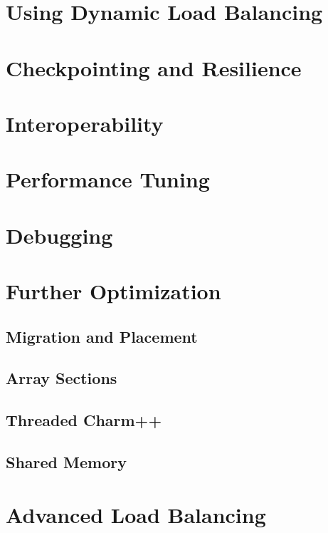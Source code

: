 \documentclass{beamer}
\begin{document}
\section[LB]{Using Dynamic Load Balancing}

\section[Fault Tol]{Checkpointing and Resilience}

\section[AMPI & Interop]{Interoperability}

\section[Tuning]{Performance Tuning}

\section[Debugging]{Debugging}


\section[Messages, Groups, Shared Mem]{Further Optimization}
\subsection[PUP and Placement]{Migration and Placement}



\subsection[Array Sections]{Array Sections}

\subsection[Threaded]{Threaded Charm++}

\subsection{Shared Memory}

\section[Custom LB]{Advanced Load Balancing}


\end{document}
